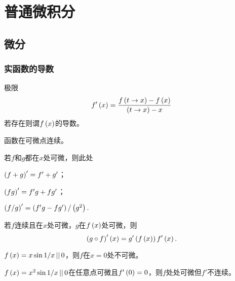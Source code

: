 \documentclass{ctexrep}
\begin{document}
\fi


\chapter{普通微积分}
  \section{微分}
  \subsection{实函数的导数}
  \begin{definition}
    极限
    \[ f'\left(x\right) = \frac{f\left(t\rightarrow x\right) - f\left(x\right)}{\left(t\rightarrow x\right)-x} \]
    若存在则谓$f\left(x\right)$的导数。
  \end{definition}
  \begin{theorem}
    函数在可微点连续。
  \end{theorem}
  \begin{theorem}
    若$f$和$g$都在$x$处可微，则此处
    \begin{cenum}
      \item $\left(f+g\right)' = f'+g'$；
      \item $\left(fg\right)'=f'g+fg'$；
      \item $\left(f/g\right)'=\left(f'g-fg'\right)/\left(g^2\right).$
    \end{cenum}
  \end{theorem}
  \begin{theorem}
    若$f$连续且在$x$处可微，$g$在$f\left(x\right)$处可微，则
    \[ \left(g\circ f\right)'\left(x\right) = g'\left(f\left(x\right)\right)f'\left(x\right). \]
  \end{theorem}
  \begin{ex}
    $f\left(x\right)=x\sin 1/x \, || \, 0$，则$f$在$x=0$处不可微。
  \end{ex}
  \begin{ex}
    $f\left(x\right)=x^2\sin 1/x \, || \, 0$在任意点可微且$f'\left(0\right)=0$，则$f$处处可微但$f'$不连续。
  \end{ex}
\end{document}

